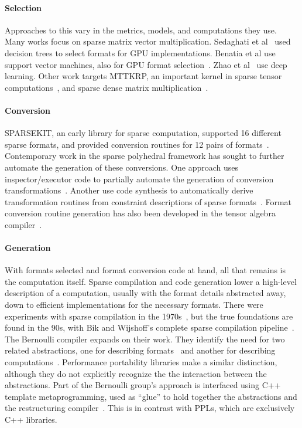 \paragraph{Selection}
Approaches to this vary in the metrics, models, and computations they use.
Many works focus on sparse matrix vector multiplication.
Sedaghati et al~\cite{sedaghati2015automatic} used decision trees to select formats for GPU implementations.
Benatia et al use support vector machines, also for GPU format selection~\cite{benatia2016sparse}.
Zhao et al~\cite{zhao2018bridging} use deep learning.
Other work targets MTTKRP, an important kernel in sparse tensor computations~\cite{sun2021input}, and sparse dense matrix multiplication~\cite{chen2018performance}.

\paragraph{Conversion}
SPARSEKIT, an early library for sparse computation, supported 16 different sparse formats, and provided conversion routines for 12 pairs of formats~\cite{saad1990sparskit}.
Contemporary work in the sparse polyhedral framework has sought to further automate the generation of these conversions.
One approach uses inspector/executor code to partially automate the generation of conversion transformations~\cite{nandy2018abstractions}.
Another use code synthesis to automatically derive transformation routines from constraint descriptions of sparse formats~\cite{popoola2023code}.
Format conversion routine generation has also been developed in the tensor algebra compiler~\cite{chou2020automatic}.

\paragraph{Generation}
With formats selected and format conversion code at hand, all that remains is the computation itself.
Sparse compilation and code generation lower a high-level description of a computation, usually with the format details abstracted away, down to efficient implementations for the necessary formats.
There were experiments with sparse compilation in the 1970s~\cite{calahan1971description,mchugh1974simpl}, but the true foundations are found in the 90s, with Bik and Wijshoff's complete sparse compilation pipeline~\cite{bik1993compilation, bik1993automatic,bik1996automatic}.
The Bernoulli compiler expands on their work.
They identify the need for two related abstractions, one for describing formats~\cite{kotlyar1997compiling} and another for describing computations~\cite{kotlyar1997relational}.
Performance portability libraries make a similar distinction, although they do not explicitly recognize the the interaction between the abstractions.
Part of the Bernoulli group's approach is interfaced using C++ template metaprogramming, used as \enquote{glue} to hold together the abstractions and the restructuring compiler~\cite{mateev2000bernoulli}.
This is in contrast with PPLs, which are exclusively C++ libraries.

